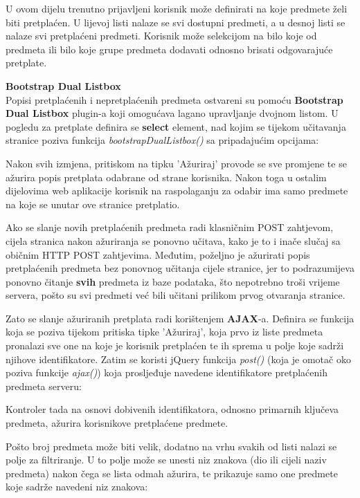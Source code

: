 \documentclass[times, utf8, zavrsni, numeric]{fer}
\begin{document}
U ovom dijelu trenutno prijavljeni korisnik može definirati na koje predmete želi biti pretplaćen. U lijevoj listi nalaze se svi dostupni predmeti, a u desnoj listi se nalaze svi pretplaćeni predmeti. Korisnik može selekcijom na bilo koje od predmeta ili bilo koje grupe predmeta dodavati odnosno brisati odgovarajuće pretplate. 

\textbf{Bootstrap Dual Listbox}\\
Popisi pretplaćenih i nepretplaćenih predmeta ostvareni su pomoću \textbf{Bootstrap Dual Listbox} plugin-a koji omogućava lagano upravljanje dvojnom listom. U pogledu za pretplate definira se \textbf{select} element, nad kojim se tijekom učitavanja stranice poziva funkcija \emph{bootstrapDualListbox()} sa pripadajućim opcijama:

\lstset{style=js}


Nakon svih izmjena, pritiskom na tipku 'Ažuriraj' provode se sve promjene te se ažurira popis pretplata odabrane od strane korisnika. Nakon toga u ostalim dijelovima web aplikacije korisnik na raspolaganju za odabir ima samo predmete na koje se unutar ove stranice pretplatio.

Ako se slanje novih pretplaćenih predmeta radi klasničnim POST zahtjevom, cijela stranica nakon ažuriranja se ponovno učitava, kako je to i inače slučaj sa običnim HTTP POST zahtjevima. Međutim, poželjno je ažurirati popis pretplaćenih predmeta bez ponovnog učitanja cijele stranice, jer to podrazumijeva ponovno čitanje \textbf{svih} predmeta iz baze podataka, što nepotrebno troši vrijeme servera, pošto su svi predmeti već bili učitani prilikom prvog otvaranja stranice.

Zato se slanje ažuriranih pretplata radi korištenjem \textbf{AJAX}-a. Definira se funkcija koja se poziva tijekom pritiska tipke 'Ažuriraj', koja prvo iz liste predmeta pronalazi sve one na koje je korisnik pretplaćen te ih sprema u polje koje sadrži njihove identifikatore. Zatim se koristi jQuery funkcija \emph{post()} (koja je omotač oko poziva funkcije \emph{ajax()}) koja prosljeđuje navedene identifikatore pretplaćenih predmeta serveru:

\lstset{style=js}


Kontroler tada na osnovi dobivenih identifikatora, odnosno primarnih ključeva predmeta, ažurira korisnikove pretplaćene predmete.

Pošto broj predmeta može biti velik, dodatno na vrhu svakih od listi nalazi se polje za filtriranje. U to polje može se unesti niz znakova (dio ili cijeli naziv predmeta) nakon čega se lista odmah ažurira, te prikazuje samo one predmete koje sadrže navedeni niz znakova:
\end{document}
